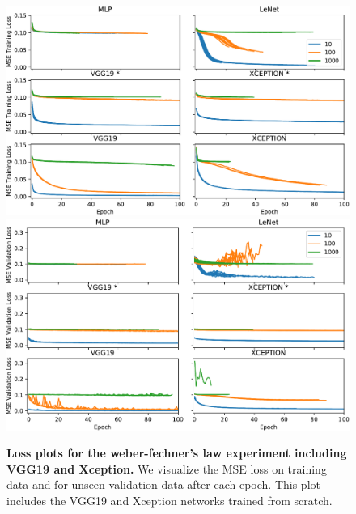 \documentclass[journal]{vgtc}                %
\begin{document}
\begin{figure}[p]
	\centering
	  \includegraphics[width=\linewidth]{../gfx/weber_training_loss_all.pdf}
	  \includegraphics[width=\linewidth]{../gfx/weber_validation_loss_all.pdf}
  \caption{\textbf{Loss plots for the weber-fechner's law experiment including VGG19 and Xception.} We visualize the MSE loss on training data and for unseen validation data after each epoch. This plot includes the VGG19 and Xception networks trained from scratch.}
	\label{fig:weber_loss_all}
\end{figure}


%
%
%
%
%

%
\end{document}
